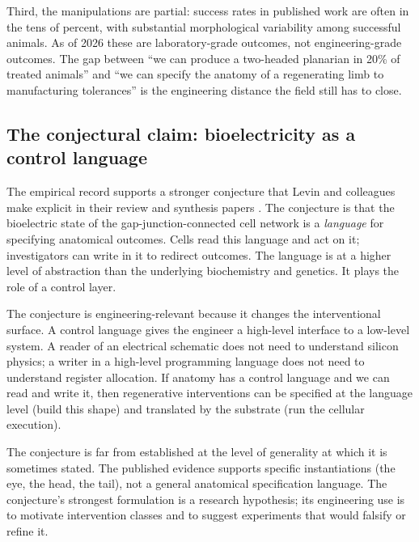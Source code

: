 Third, the manipulations are partial: success rates in published work
are often in the tens of percent, with substantial morphological
variability among successful animals. As of 2026 these are
laboratory-grade outcomes, not engineering-grade outcomes. The gap
between ``we can produce a two-headed planarian in 20\% of treated
animals'' and ``we can specify the anatomy of a regenerating limb to
manufacturing tolerances'' is the engineering distance the field still
has to close.

\subsection{The conjectural claim: bioelectricity as a control language}

The empirical record supports a stronger conjecture that Levin and
colleagues make explicit in their review and synthesis papers
\cite{paper:v6c13-pezzulo-levin-2015,
paper:v6c13-levin-comp-boundary-2019,
paper:v6c13-levin-life-death-2021,
paper:v6c13-levin-darwin-agential-2023}. The conjecture is that the
bioelectric state of the gap-junction-connected cell network is a
\textit{language} for specifying anatomical outcomes. Cells read this
language and act on it; investigators can write in it to redirect
outcomes. The language is at a higher level of abstraction than the
underlying biochemistry and genetics. It plays the role of a control
layer.

The conjecture is engineering-relevant because it changes the
interventional surface. A control language gives the engineer a
high-level interface to a low-level system. A reader of an electrical
schematic does not need to understand silicon physics; a writer in a
high-level programming language does not need to understand register
allocation. If anatomy has a control language and we can read and
write it, then regenerative interventions can be specified at the
language level (build this shape) and translated by the substrate (run
the cellular execution).

The conjecture is far from established at the level of generality at
which it is sometimes stated. The published evidence supports specific
instantiations (the eye, the head, the tail), not a general anatomical
specification language. The conjecture's strongest formulation is a
research hypothesis; its engineering use is to motivate intervention
classes and to suggest experiments that would falsify or refine it.

